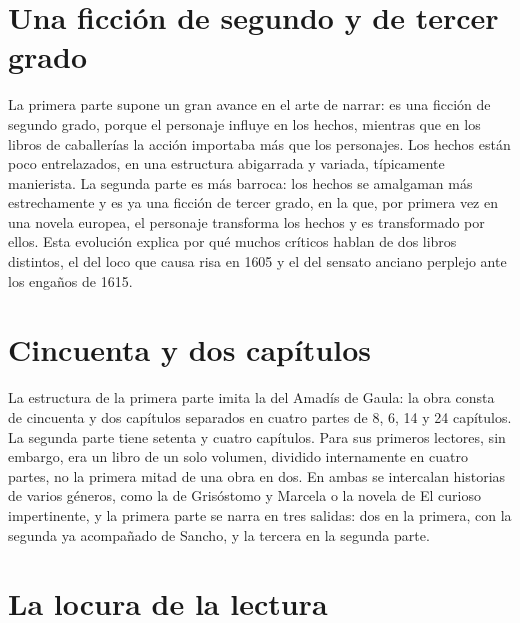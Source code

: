 \documentclass{book}
\begin{document}

\section{Una ficción de segundo y de tercer grado}

La primera parte supone un gran avance en el arte de narrar: es una ficción de segundo grado, porque el personaje influye en los hechos, mientras que en los libros de caballerías la acción importaba más que los personajes. Los hechos están poco entrelazados, en una estructura abigarrada y variada, típicamente manierista. La segunda parte es más barroca: los hechos se amalgaman más estrechamente y es ya una ficción de tercer grado, en la que, por primera vez en una novela europea, el personaje transforma los hechos y es transformado por ellos. Esta evolución explica por qué muchos críticos hablan de dos libros distintos, el del loco que causa risa en 1605 y el del sensato anciano perplejo ante los engaños de 1615.


\section{Cincuenta y dos capítulos}

La estructura de la primera parte imita la del Amadís de Gaula: la obra consta de cincuenta y dos capítulos separados en cuatro partes de 8, 6, 14 y 24 capítulos. La segunda parte tiene setenta y cuatro capítulos. Para sus primeros lectores, sin embargo, era un libro de un solo volumen, dividido internamente en cuatro partes, no la primera mitad de una obra en dos. En ambas se intercalan historias de varios géneros, como la de Grisóstomo y Marcela o la novela de El curioso impertinente, y la primera parte se narra en tres salidas: dos en la primera, con la segunda ya acompañado de Sancho, y la tercera en la segunda parte.


\section{La locura de la lectura}
\end{document}
